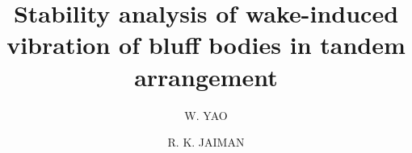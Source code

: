 \usepackage{environ}

\usepackage{xcolor}
\usepackage{tikz}

\newcommand{\reddashdot}{\raisebox{2pt}{\tikz{\draw[red,dashdotted,line width=1.2pt](0,0) -- (5mm,0);}}}
\newcommand{\bluedashdot}{\raisebox{2pt}{\tikz{\draw[blue,dashdotted,line width=1.2pt](0,0) -- (5mm,0);}}}
\newcommand{\greendashdot}{\raisebox{2pt}{\tikz{\draw[green,dashdotted,line width=1.2pt](0,0) -- (5mm,0);}}}
\newcommand{\greendash}{\raisebox{2pt}{\tikz{\draw[green,dashed,line width=1.2pt](0,0) -- (5mm,0);}}}
\newcommand{\greensolid}{\raisebox{2pt}{\tikz{\draw[green,solid,line width=1.2pt](0,0) -- (5mm,0);}}}
\newcommand{\reddash}{\raisebox{2pt}{\tikz{\draw[red,dashed,line width=1.2pt](0,0) -- (5mm,0);}}}
\newcommand{\reddot}{\raisebox{2pt}{\tikz{\draw[red,dotted,line width=1.2pt](0,0) -- (5mm,0);}}}
\newcommand{\bluedash}{\raisebox{2pt}{\tikz{\draw[blue,dashed,line width=1.2pt](0,0) -- (5mm,0);}}}
\newcommand{\blackdash}{\raisebox{2pt}{\tikz{\draw[black,dashed,line width=1.2pt](0,0) -- (5mm,0);}}}
%
%
%
%
%


\title{Stability analysis of wake-induced vibration of bluff bodies in tandem arrangement %
}


\author{W. YAO         \and
        R. K. JAIMAN %
}



